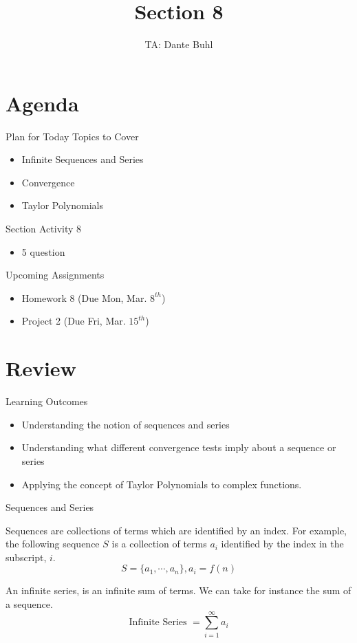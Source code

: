 \documentclass{beamer}
\title{Section 8}
\author{TA: Dante Buhl}
\institute{UCSC Math-19B}
\begin{document}
\newcommand{\bmp}[1]{\begin{minipage}{#1\textwidth}}
\newcommand{\emp}{\end{minipage}}


\frame{\titlepage}

\section{Agenda}
\begin{frame}{Plan for Today}
    Topics to Cover
    \begin{itemize}
        \item Infinite Sequences and Series
        \item Convergence
        \item Taylor Polynomials
    \end{itemize}
    Section Activity 8
    \begin{itemize}
        \item 5 question
    \end{itemize}
    Upcoming Assignments
    \begin{itemize}
        \item Homework 8 (Due Mon, Mar. $8^{th}$)
        \item Project 2 (Due Fri, Mar. $15^{th}$)
    \end{itemize}
\end{frame}


\section{Review}
\begin{frame}{Learning Outcomes}
    \begin{itemize}
        \item Understanding the notion of sequences and series
        \item Understanding what different convergence tests imply about a sequence or series
        \item Applying the concept of Taylor Polynomials to complex functions. 
    \end{itemize}
\end{frame}

\begin{frame}{Sequences and Series}

Sequences are collections of terms which are identified by an index. For example, the following sequence $S$ is a collection of terms $a_i$ identified by the index in the subscript, $i$.
\[
    S = \{ a_1, \cdots, a_n \}, a_i = f(n)
\]

An infinite series, is an infinite sum of terms. We can take for instance the sum of a sequence. 
\[
    \text{Infinite Series } = \sum_{i = 1}^\infty a_i 
\]

\end{frame}
\end{document}
